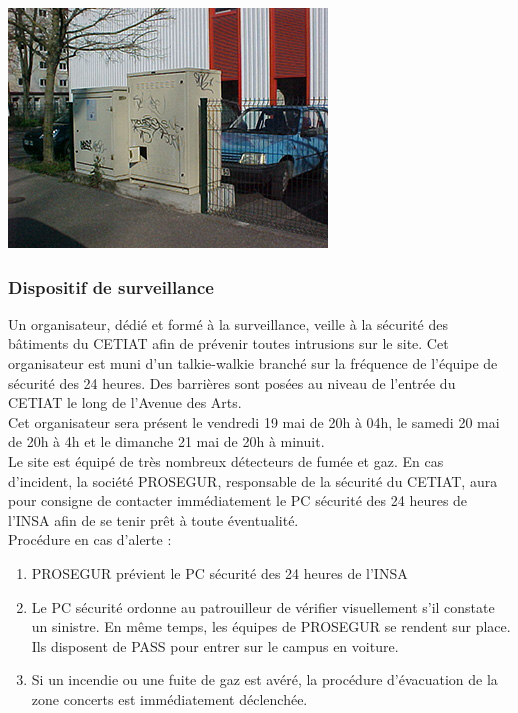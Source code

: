 \documentclass[hidelinks, paper=a4, fontsize=13pt]{report}
\begin{document}
\begin{center}
	\includegraphics[scale=0.8]{Annexes/Images/coupureGazCetiat}
\end{center}

\subsubsection{Dispositif de surveillance}
Un organisateur, dédié et formé à la surveillance, veille à la sécurité des bâtiments du CETIAT afin de prévenir toutes intrusions sur le site. Cet organisateur est muni d’un talkie-walkie branché sur la fréquence de l'équipe de sécurité des 24 heures. Des barrières sont posées au niveau de l’entrée du CETIAT le long de l’Avenue des Arts.\\
Cet organisateur sera présent le vendredi 19 mai de 20h à 04h, le samedi 20 mai de 20h à 4h et le dimanche 21 mai de 20h à minuit. \\

Le site est équipé de très nombreux détecteurs de fumée et gaz. En cas d’incident, la société PROSEGUR, responsable de la sécurité du CETIAT, aura pour consigne de contacter immédiatement le PC sécurité des 24 heures de l’INSA afin de se tenir prêt à toute éventualité.\\

Procédure en cas d’alerte :
\begin{enumerate}
	\item PROSEGUR prévient le PC sécurité des 24 heures de l’INSA
	\item Le PC sécurité ordonne au patrouilleur de vérifier visuellement s’il constate un sinistre. En même temps, les équipes de PROSEGUR se rendent sur place. Ils disposent de PASS pour entrer sur le campus en voiture.
	\item Si un incendie ou une fuite de gaz est avéré, la procédure d’évacuation de la zone concerts est immédiatement déclenchée.
\end{enumerate}
\end{document}
